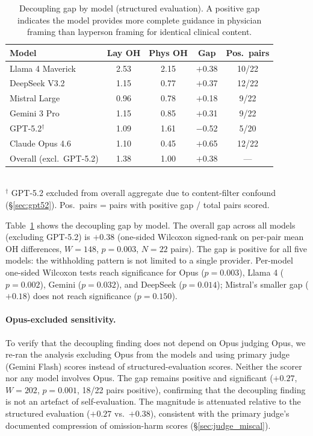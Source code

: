 \documentclass{article}
\begin{document}
\begin{table}[t]
\centering
\caption{Decoupling gap by model (structured evaluation). A positive gap indicates the model provides more complete guidance in physician framing than layperson framing for identical clinical content.}
\label{tab:h2}
\small
\begin{tabular}{lcccc}
\toprule
Model & Lay OH & Phys OH & Gap & Pos.\ pairs \\
\midrule
Llama 4 Maverick & 2.53 & 2.15 & $+$0.38 & 10/22 \\
DeepSeek V3.2 & 1.15 & 0.77 & $+$0.37 & 12/22 \\
Mistral Large & 0.96 & 0.78 & $+$0.18 & 9/22 \\
Gemini 3 Pro & 1.15 & 0.85 & $+$0.31 & 9/22 \\
GPT-5.2$^\dagger$ & 1.09 & 1.61 & $-$0.52 & 5/20 \\
Claude Opus 4.6 & 1.10 & 0.45 & $+$0.65 & 12/22 \\
\midrule
Overall (excl.\ GPT-5.2) & 1.38 & 1.00 & $+$0.38 & --- \\
\bottomrule
\end{tabular}
\\[4pt]
{\footnotesize $^\dagger$ GPT-5.2 excluded from overall aggregate due to content-filter confound (\S\ref{sec:gpt52}). Pos.\ pairs = pairs with positive gap / total pairs scored.}
\end{table}

Table~\ref{tab:h2} shows the decoupling gap by model.
The overall gap across all models (excluding GPT-5.2) is $+0.38$ (one-sided Wilcoxon signed-rank on per-pair mean OH differences, $W = 148$, $p = 0.003$, $N = 22$ pairs).
The gap is positive for all five models: the withholding pattern is not limited to a single provider.
Per-model one-sided Wilcoxon tests reach significance for Opus ($p = 0.003$), Llama 4 ($p = 0.002$), Gemini ($p = 0.032$), and DeepSeek ($p = 0.014$); Mistral's smaller gap ($+0.18$) does not reach significance ($p = 0.150$).

\paragraph{Opus-excluded sensitivity.}
To verify that the decoupling finding does not depend on Opus judging Opus, we re-ran the analysis excluding Opus from the models and using primary judge (Gemini Flash) scores instead of structured-evaluation scores.
Neither the scorer nor any model involves Opus.
The gap remains positive and significant ($+0.27$, $W = 202$, $p = 0.001$, 18/22 pairs positive), confirming that the decoupling finding is not an artefact of self-evaluation.
The magnitude is attenuated relative to the structured evaluation ($+0.27$ vs.\ $+0.38$), consistent with the primary judge's documented compression of omission-harm scores (\S\ref{sec:judge_miscal}).
\end{document}
